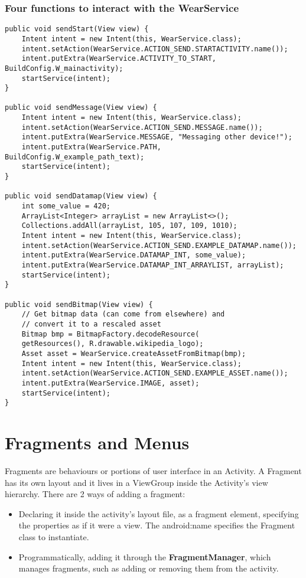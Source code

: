 \documentclass[11pt]{article}
\begin{document}
\subsubsection{Four functions to interact with the WearService}
\lstset{language = Java}
\begin{lstlisting}
public void sendStart(View view) {
    Intent intent = new Intent(this, WearService.class);
    intent.setAction(WearService.ACTION_SEND.STARTACTIVITY.name());
    intent.putExtra(WearService.ACTIVITY_TO_START, BuildConfig.W_mainactivity);
    startService(intent);
}

public void sendMessage(View view) {
    Intent intent = new Intent(this, WearService.class);
    intent.setAction(WearService.ACTION_SEND.MESSAGE.name());
    intent.putExtra(WearService.MESSAGE, "Messaging other device!");
    intent.putExtra(WearService.PATH, BuildConfig.W_example_path_text);
    startService(intent);
}

public void sendDatamap(View view) {
    int some_value = 420;
    ArrayList<Integer> arrayList = new ArrayList<>();
    Collections.addAll(arrayList, 105, 107, 109, 1010);
    Intent intent = new Intent(this, WearService.class);
    intent.setAction(WearService.ACTION_SEND.EXAMPLE_DATAMAP.name());
    intent.putExtra(WearService.DATAMAP_INT, some_value);
    intent.putExtra(WearService.DATAMAP_INT_ARRAYLIST, arrayList);
    startService(intent);
}

public void sendBitmap(View view) {
    // Get bitmap data (can come from elsewhere) and
    // convert it to a rescaled asset
    Bitmap bmp = BitmapFactory.decodeResource(
    getResources(), R.drawable.wikipedia_logo);
    Asset asset = WearService.createAssetFromBitmap(bmp);
    Intent intent = new Intent(this, WearService.class);
    intent.setAction(WearService.ACTION_SEND.EXAMPLE_ASSET.name());
    intent.putExtra(WearService.IMAGE, asset);
    startService(intent);
}
\end{lstlisting}







\section{Fragments and Menus}
Fragments are behaviours or portions of user interface in an Activity. A Fragment has its own layout and it lives in a ViewGroup inside the Activity’s view hierarchy. There are 2 ways of adding a fragment: 
\begin{itemize}
    \item Declaring it inside the activity’s layout file, as a fragment element, specifying the properties as if it were a view. The android:name specifies the Fragment class to instantiate.
    \item Programmatically, adding it through the \textbf{FragmentManager}, which manages fragments, such as adding or removing them from the activity.
\end{itemize}
\end{document}
